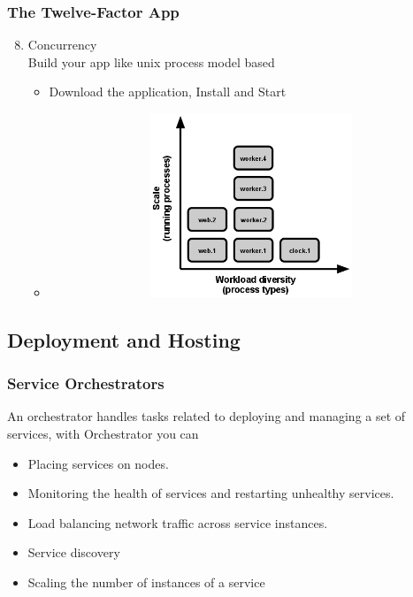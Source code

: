 \documentclass{beamer}
\begin{document}
	\begin{frame}
		\frametitle{The Twelve-Factor App}
		\begin{enumerate}
			\setcounter{enumi}{7}
			\item Concurrency \\
			\hspace{2mm} \scriptsize{Build your app like unix process model based}
				
			\begin{itemize}
				\item<1-> \scriptsize {Download the application, Install and Start}
				\item<1->[]
				\begin{figure}[h]
					\includegraphics[width=100mm,height= 55mm, scale=1]{img/process-types.png}
				\end{figure}
			\end{itemize}
		\end{enumerate}
	\end{frame}
	

	\subsection {Deployment and Hosting}
		\begin{frame}
			\frametitle{Service Orchestrators}
				An orchestrator handles tasks related to deploying and managing a set of services, with Orchestrator you can 
				\begin{itemize}
					\item<1-> Placing services on nodes. 
					\item<2-> Monitoring the health of services and restarting unhealthy services.
					\item<3-> Load balancing network traffic across service instances. 
					\item<4-> Service discovery
					\item<5-> Scaling the number of instances of a service
				\end{itemize}
			\vspace{100mm}
		\end{frame}
	
\end{document}
